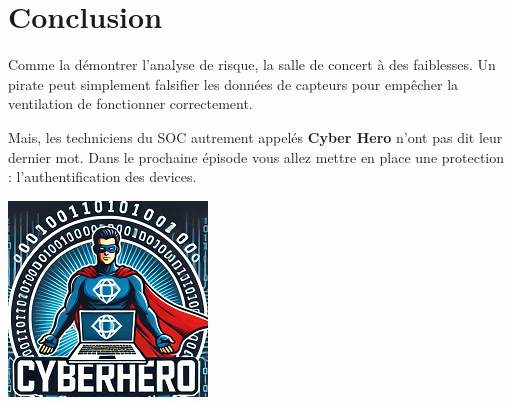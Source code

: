\documentclass[french, 12pt]{article}%
\newif\ifPROF
\begin{document}
\section{Conclusion}

\begin{minipage}{0.55\linewidth}
Comme la démontrer l'analyse de risque, la salle de concert à des faiblesses. Un pirate peut simplement falsifier les données de capteurs pour empêcher la ventilation de fonctionner correctement. 


Mais, les techniciens du SOC autrement appelés \textbf{Cyber Hero} n'ont pas dit leur dernier mot. Dans le prochaine épisode vous allez mettre en place une protection : l'authentification des devices.
\end{minipage}
\begin{minipage}{0.44\linewidth}
\begin{center}
\includegraphics[scale=0.7]{./ressource/cyberHro.png}
\end{center}
\end{minipage}


\ifPROF
\color{red}
Pense bête installation.
\begin{lstlisting}[style=commande]

lsub modele de la puce

sudo ip link set eth0 promisc on

\end{lstlisting}


Choix des puces : Ralink RT5372 

Les modèles comme le Panda PAU06 ou l’EDUP EP-MS8551
\normalcolor
\fi
\end{document}

